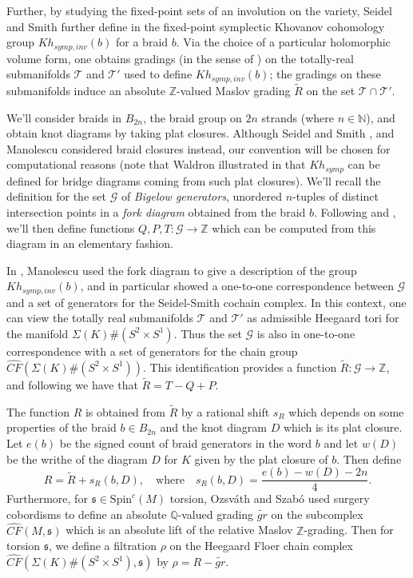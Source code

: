 \documentclass[11pt]{article}
\theoremstyle{plain} \newtheorem{thm}{Theorem}[subsection]
\theoremstyle{plain} \newtheorem{cor}[thm]{Corollary}
\theoremstyle{plain} \newtheorem{prop}[thm]{Proposition}
\theoremstyle{plain} \newtheorem{conj}[thm]{Conjecture}
\theoremstyle{plain} \newtheorem{lem}[thm]{Lemma}
\theoremstyle{definition} \newtheorem{df}[thm]{Definition}
\theoremstyle{remark} \newtheorem{rmk}[thm]{Remark}
\theoremstyle{remark} \newtheorem{obs}[thm]{Observation}
\newcommand{\Bn}{B_{2n}}
\newcommand{\DBCs}[1]{\Sigma(#1)\#(S^{2}\times S^{1})}
\newcommand{\G}{\mathcal{G}}
\newcommand{\T}{\mathcal{T}}
\newcommand{\tld}[1]{\widetilde{#1}}
\newcommand{\OS}{Ozsv\'ath and Szab\'o }
\newcommand{\CFxs}[1]{\widehat{CF}(\DBCs{#1}, \mathfrak{s})}
\newcommand{\Kst}[1]{Kh_{symp,inv}(#1)}
\begin{document}
Further, by studying the fixed-point sets of an involution on the variety, Seidel and Smith further define in \cite{ss:R2} the fixed-point symplectic Khovanov cohomology group $\Kst{b}$ for a braid $b$.  Via the choice of a particular holomorphic volume form, one obtains gradings (in the sense of \cite{s:GL}) on the totally-real submanifolds $\T$ and $\T'$ used to define $\Kst{b}$; the gradings on these submanifolds induce an absolute $\mathbb{Z}$-valued Maslov grading $\tld{R}$ on the set $\T \cap \T'$.

We'll consider braids in $\Bn$, the braid group on $2n$ strands (where $n \in \mathbb{N}$), and obtain knot diagrams by taking plat closures.  Although Seidel and Smith \cite{ss:R1},\cite{ss:R2} and Manolescu \cite{cm:R} considered braid closures instead, our convention will be chosen for computational reasons (note that Waldron illustrated in \cite{jw:plat} that $Kh_{symp}$ can be defined for bridge diagrams coming from such plat closures).  We'll recall the definition for the set $\G$ of \textit{Bigelow generators}, unordered $n$-tuples of distinct intersection points in a \textit{fork diagram} obtained from the braid $b$.  Following \cite{big:jones} and \cite{cm:R}, we'll then define functions $Q,  P, T: \G \rightarrow \mathbb{Z}$ which can be computed from this diagram in an elementary fashion.

In \cite{cm:R}, Manolescu used the fork diagram to give a description of the group $\Kst{b}$, and in particular showed a one-to-one correspondence between $\G$ and a set of generators for the Seidel-Smith cochain complex.  In this context, one can view the totally real submanifolds $\T$ and $\T'$ as admissible Heegaard tori for the manifold $\DBCs{K}$.  Thus the set $\G$ is also in one-to-one correspondence with a set of generators for the chain group  $\widehat{CF}(\DBCs{K})$.  This identification provides a function $\tld{R}: \G \rightarrow \mathbb{Z}$, and following \cite{cm:R} we have that $\tld{R} = T - Q +  P$.

The function $R$ is obtained from $\tld{R}$ by a rational shift $s_{R}$ which depends on some properties of the braid $b \in \Bn$ and the knot diagram $D$ which is its plat closure.  Let $e(b)$ be the signed count of braid generators in the word $b$ and let $w(D)$ be the writhe of the diagram $D$ for $K$ given by the plat closure of $b$.  Then define
\begin{equation*}
R = \tld{R} + s_{R}(b,D), \quad \text{where} \quad s_{R}(b,D) = \frac{e(b) - w(D) -2n}{4}.
\end{equation*}
Furthermore, for $\mathfrak{s} \in \text{Spin}^{c}(M)$ torsion, \OS used surgery cobordisms to define an absolute $\mathbb{Q}$-valued grading $\tld{gr}$ on the subcomplex $\widehat{CF}(M, \mathfrak{s})$ which is an absolute lift of the relative Maslov $\mathbb{Z}$-grading.  Then for torsion $\mathfrak{s}$, we define a filtration $\rho$ on the Heegaard Floer chain complex $\CFxs{K}$ by $\rho = R - \tld{gr}$.
\end{document}
